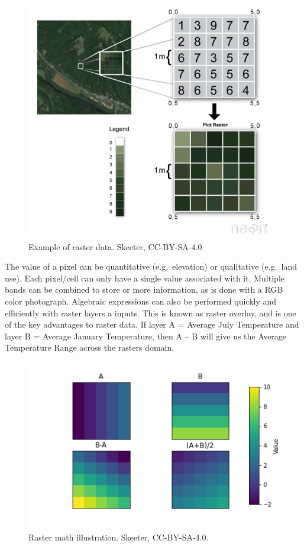 \documentclass[
]{book}
\begin{document}
\begin{figure}
\includegraphics[width=0.75\linewidth]{images/03-raster-example} \caption{Example of raster data. Skeeter, CC-BY-SA-4.0}\label{fig:3-raster-example}
\end{figure}

The value of a pixel can be quantitative (e.g.~elevation) or qualitative (e.g.~land use). Each pixel/cell can only have a single value associated with it. Multiple bands can be combined to store or more information, as is done with a RGB color photograph. Algebraic expressions can also be performed quickly and efficiently with raster layers a inputs. This is known as raster overlay, and is one of the key advantages to raster data. If layer A = Average July Temperature and layer B = Average January Temperature, then A -- B will give us the Average Temperature Range across the rasters domain.

\begin{figure}
\includegraphics[width=0.75\linewidth]{images/03-raster-overlay} \caption{Raster math illustration. Skeeter, CC-BY-SA-4.0.}\label{fig:3-raster-overlay}
\end{figure}
\end{document}
